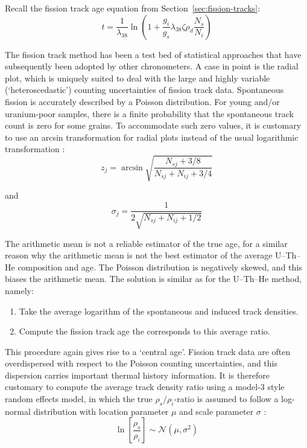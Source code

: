 \begin{refsection}
Recall the fission track age equation from
Section~\ref{sec:fission-tracks}:
\begin{equation}
t =
\frac{1}{\lambda_{38}}\ln\left(1+\frac{g_i}{g_s}
\lambda_{38}\zeta\rho_d\frac{N_s}{N_i}\right)
\label{eq:tzeta2}
\end{equation}

The fission track method has been a test bed of statistical approaches
that have subsequently been adopted by other chronometers. A case in
point is the radial plot, which is uniquely suited to deal with the
large and highly variable (`heteroscedastic') counting uncertainties
of fission track data. Spontaneous fission is accurately described by
a Poisson distribution. For young and/or uranium-poor samples, there
is a finite probability that the spontaneous track count is zero for
some grains.  To accommodate such zero values, it is customary to use
an arcsin transformation for radial plots instead of the usual
logarithmic transformation \citep{galbraith1990a}:
\begin{equation}
z_j = \arcsin\sqrt{\frac{N_{sj} + 3/8}{N_{sj}+N_{ij}+3/4}}
\label{eq:zj}
\end{equation}

\noindent and
\begin{equation}
\sigma_j = \frac{1}{2\sqrt{N_{sj}+N_{ij}+1/2}}
\label{eq:sj}
\end{equation}

The arithmetic mean is not a reliable estimator of the true age, for a
similar reason why the arithmetic mean is not the best estimator of
the average U--Th--He composition and age. The Poisson distribution is
negatively skewed, and this biases the arithmetic mean. The solution
is similar as for the U--Th--He method, namely:

\begin{enumerate}
\item Take the average logarithm of the spontaneous and induced
  track densities.
\item Compute the fission track age the corresponds to this average
  ratio.
\end{enumerate}

This procedure again gives rise to a `central age'. Fission track data
are often overdispersed with respect to the Poisson counting
uncertainties, and this dispersion carries important thermal history
information. It is therefore customary to compute the average track
density ratio using a model-3 style random effects model, in which the
true $\rho_s/\rho_i$-ratio is assumed to follow a log-normal
distribution with location parameter $\mu$ and scale parameter
$\sigma$ \citep{galbraith1993}:
\begin{equation}
\ln\left[\frac{\rho_s}{\rho_i}\right] \sim \mathcal{N}(\mu,\sigma^2)
\label{eq:logrhosrhoi}
\end{equation}


\end{refsection}
